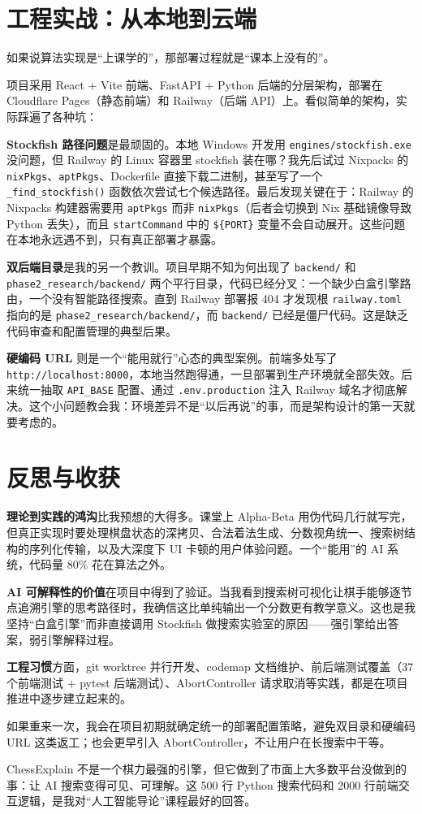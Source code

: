 \documentclass[12pt,a4paper]{ctexart}
\begin{document}
\section{工程实战：从本地到云端}

如果说算法实现是“上课学的”，那部署过程就是“课本上没有的”。

项目采用 React + Vite 前端、FastAPI + Python 后端的分层架构，部署在 Cloudflare Pages（静态前端）和 Railway（后端 API）上。看似简单的架构，实际踩遍了各种坑：

\textbf{Stockfish 路径问题}是最顽固的。本地 Windows 开发用 \texttt{engines/stockfish.exe} 没问题，但 Railway 的 Linux 容器里 stockfish 装在哪？我先后试过 Nixpacks 的 \texttt{nixPkgs}、\texttt{aptPkgs}、Dockerfile 直接下载二进制，甚至写了一个 \texttt{\_find\_stockfish()} 函数依次尝试七个候选路径。最后发现关键在于：Railway 的 Nixpacks 构建器需要用 \texttt{aptPkgs} 而非 \texttt{nixPkgs}（后者会切换到 Nix 基础镜像导致 Python 丢失），而且 \texttt{startCommand} 中的 \texttt{\$\{PORT\}} 变量不会自动展开。这些问题在本地永远遇不到，只有真正部署才暴露。

\textbf{双后端目录}是我的另一个教训。项目早期不知为何出现了 \texttt{backend/} 和 \texttt{phase2\_research/backend/} 两个平行目录，代码已经分叉：一个缺少白盒引擎路由，一个没有智能路径搜索。直到 Railway 部署报 404 才发现根 \texttt{railway.toml} 指向的是 \texttt{phase2\_research/backend/}，而 \texttt{backend/} 已经是僵尸代码。这是缺乏代码审查和配置管理的典型后果。

\textbf{硬编码 URL} 则是一个“能用就行”心态的典型案例。前端多处写了 \texttt{http://localhost:8000}，本地当然跑得通，一旦部署到生产环境就全部失效。后来统一抽取 \texttt{API\_BASE} 配置、通过 \texttt{.env.production} 注入 Railway 域名才彻底解决。这个小问题教会我：环境差异不是“以后再说”的事，而是架构设计的第一天就要考虑的。

\section{反思与收获}

\textbf{理论到实践的鸿沟}比我预想的大得多。课堂上 Alpha-Beta 用伪代码几行就写完，但真正实现时要处理棋盘状态的深拷贝、合法着法生成、分数视角统一、搜索树结构的序列化传输，以及大深度下 UI 卡顿的用户体验问题。一个“能用”的 AI 系统，代码量 80\% 花在算法之外。

\textbf{AI 可解释性的价值}在项目中得到了验证。当我看到搜索树可视化让棋手能够逐节点追溯引擎的思考路径时，我确信这比单纯输出一个分数更有教学意义。这也是我坚持“白盒引擎”而非直接调用 Stockfish 做搜索实验室的原因——强引擎给出答案，弱引擎解释过程。

\textbf{工程习惯}方面，git worktree 并行开发、codemap 文档维护、前后端测试覆盖（37 个前端测试 + pytest 后端测试）、AbortController 请求取消等实践，都是在项目推进中逐步建立起来的。

如果重来一次，我会在项目初期就确定统一的部署配置策略，避免双目录和硬编码 URL 这类返工；也会更早引入 AbortController，不让用户在长搜索中干等。

ChessExplain 不是一个棋力最强的引擎，但它做到了市面上大多数平台没做到的事：让 AI 搜索变得可见、可理解。这 500 行 Python 搜索代码和 2000 行前端交互逻辑，是我对“人工智能导论”课程最好的回答。
\end{document}
